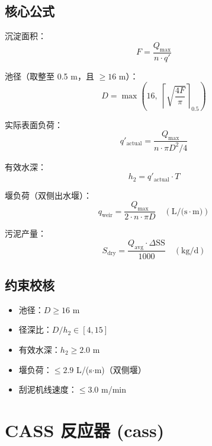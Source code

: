 \documentclass[12pt,a4paper]{ctexart}
\begin{document}
\subsection{核心公式}
沉淀面积：
\begin{equation}
F = \frac{Q_{\text{max}}}{n \cdot q'}
\end{equation}

池径（取整至 0.5 m，且 $\ge 16$ m）：
\begin{equation}
D = \max\left(16,\; \left\lceil \sqrt{\frac{4F}{\pi}} \right\rceil_{0.5}\right)
\end{equation}

实际表面负荷：
\begin{equation}
q'_{\text{actual}} = \frac{Q_{\text{max}}}{n \cdot \pi D^2 / 4}
\end{equation}

有效水深：
\begin{equation}
h_2 = q'_{\text{actual}} \cdot T
\end{equation}

堰负荷（双侧出水堰）：
\begin{equation}
q_{\text{weir}} = \frac{Q_{\text{max}}}{2 \cdot n \cdot \pi D} \quad (\text{L/(s}\cdot\text{m)})
\end{equation}

污泥产量：
\begin{equation}
S_{\text{dry}} = \frac{Q_{\text{avg}} \cdot \Delta \text{SS}}{1000} \quad (\text{kg/d})
\end{equation}

\subsection{约束校核}
\begin{itemize}
  \item 池径：$D \ge 16$ m
  \item 径深比：$D/h_2 \in [4, 15]$
  \item 有效水深：$h_2 \ge 2.0$ m
  \item 堰负荷：$\le 2.9$ L/(s$\cdot$m)（双侧堰）
  \item 刮泥机线速度：$\le 3.0$ m/min
\end{itemize}

\section{CASS 反应器 (cass)}
\end{document}
